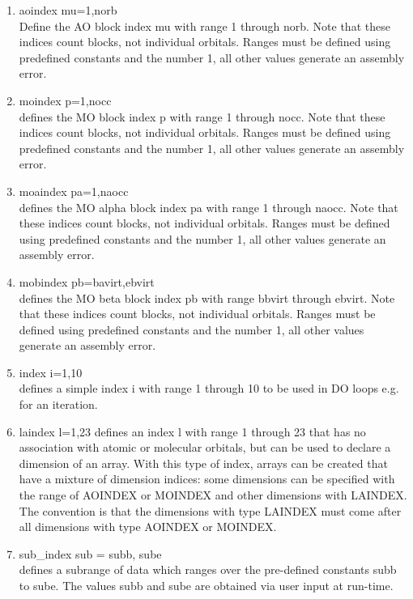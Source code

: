 \documentclass[12pt]{article}
\begin{document}
\begin{enumerate} 

\item aoindex mu=1,norb\\ 
Define the AO block index mu with range 1 through norb. Note that these indices count 
blocks, not individual orbitals. Ranges must be defined using predefined constants and 
the number 1, all other values generate an assembly error. 

\item moindex p=1,nocc\\ 
defines the MO block index p with range 1 through nocc. Note that these indices count 
blocks, not individual orbitals. Ranges must be defined using predefined constants 
and the number 1, all other values generate an assembly error.

\item moaindex pa=1,naocc\\ 
defines the MO alpha block index pa with range 1 through naocc. Note that these indices 
count blocks, not individual orbitals. Ranges must be defined using predefined constants 
and the number 1, all other values generate an assembly error.

\item mobindex pb=bavirt,ebvirt\\ 
defines the MO beta block index pb with range bbvirt through ebvirt. Note that these 
indices count blocks, not individual orbitals. Ranges must be defined using predefined 
constants and the number 1, all other values generate an assembly error.

\item index i=1,10\\ 
defines a simple index i with range 1 through 10 to be used in DO loops e.g. for an 
iteration.

\item laindex l=1,23 defines an index l with range 1 through 23 that has no 
association with atomic or molecular orbitals, but can be used to declare a dimension 
of an array. With this type of index, arrays can be created that have a mixture of 
dimension indices: some dimensions can be specified with the range of AOINDEX or 
MOINDEX and other dimensions with LAINDEX. The convention is that the dimensions with 
type LAINDEX must come after all dimensions with type AOINDEX or MOINDEX.

\item sub\_index sub = subb, sube\\ 
defines a subrange of data which ranges over the pre-defined constants subb to sube.  
The values subb and sube are obtained via user input at run-time.  


\end{enumerate}
\end{document}
